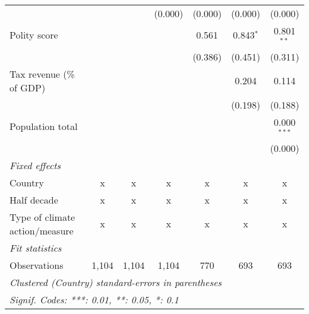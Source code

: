 \begin{tabular}{lcccccc}
                                                                                           &         &         & (0.000)       & (0.000)       & (0.000)       & (0.000)\\   
   Polity score                                                                            &         &         &               & 0.561         & 0.843$^{*}$   & 0.801$^{**}$\\   
                                                                                           &         &         &               & (0.386)       & (0.451)       & (0.311)\\   
   Tax revenue (\% of GDP)                                                                 &         &         &               &               & 0.204         & 0.114\\   
                                                                                           &         &         &               &               & (0.198)       & (0.188)\\   
   Population total                                                                        &         &         &               &               &               & 0.000$^{***}$\\   
                                                                                           &         &         &               &               &               & (0.000)\\   
   \emph{Fixed effects}\\
   Country                                                                                 & x       & x       & x             & x             & x             & x\\  
   Half decade                                                                             & x       & x       & x             & x             & x             & x\\  
   Type of climate action/measure                                                          & x       & x       & x             & x             & x             & x\\  
   \midrule \emph{Fit statistics}\\
   Observations                                                                            & 1,104   & 1,104   & 1,104         & 770           & 693           & 693\\  
   \midrule
   \multicolumn{7}{l}{\emph{Clustered (Country) standard-errors in parentheses}}\\
   \multicolumn{7}{l}{\emph{Signif. Codes: ***: 0.01, **: 0.05, *: 0.1}}\\
\end{tabular}
\par\endgroup


